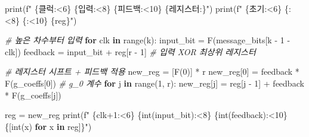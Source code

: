 \documentclass[
  oneside]{article}
\newenvironment{Shaded}{}{}
\newcommand{\BuiltInTok}[1]{\textcolor[rgb]{0.00,0.50,0.00}{#1}}
\newcommand{\CommentTok}[1]{\textcolor[rgb]{0.38,0.63,0.69}{\textit{#1}}}
\newcommand{\ControlFlowTok}[1]{\textcolor[rgb]{0.00,0.44,0.13}{\textbf{#1}}}
\newcommand{\DecValTok}[1]{\textcolor[rgb]{0.25,0.63,0.44}{#1}}
\newcommand{\KeywordTok}[1]{\textcolor[rgb]{0.00,0.44,0.13}{\textbf{#1}}}
\newcommand{\NormalTok}[1]{#1}
\newcommand{\OperatorTok}[1]{\textcolor[rgb]{0.40,0.40,0.40}{#1}}
\newcommand{\SpecialCharTok}[1]{\textcolor[rgb]{0.25,0.44,0.63}{#1}}
\newcommand{\SpecialStringTok}[1]{\textcolor[rgb]{0.73,0.40,0.53}{#1}}
\newcommand{\StringTok}[1]{\textcolor[rgb]{0.25,0.44,0.63}{#1}}
\begin{document}
\begin{Shaded}
\begin{Highlighting}[]
    \BuiltInTok{print}\NormalTok{(}\SpecialStringTok{f"  }\SpecialCharTok{\{}\StringTok{\textquotesingle{}클럭\textquotesingle{}}\SpecialCharTok{:\textless{}6\}}\SpecialStringTok{ }\SpecialCharTok{\{}\StringTok{\textquotesingle{}입력\textquotesingle{}}\SpecialCharTok{:\textless{}8\}}\SpecialStringTok{ }\SpecialCharTok{\{}\StringTok{\textquotesingle{}피드백\textquotesingle{}}\SpecialCharTok{:\textless{}10\}}\SpecialStringTok{ }\SpecialCharTok{\{}\StringTok{\textquotesingle{}레지스터\textquotesingle{}}\SpecialCharTok{:\}}\SpecialStringTok{"}\NormalTok{)}
    \BuiltInTok{print}\NormalTok{(}\SpecialStringTok{f"  }\SpecialCharTok{\{}\StringTok{\textquotesingle{}초기\textquotesingle{}}\SpecialCharTok{:\textless{}6\}}\SpecialStringTok{ }\SpecialCharTok{\{}\StringTok{\textquotesingle{}{-}\textquotesingle{}}\SpecialCharTok{:\textless{}8\}}\SpecialStringTok{ }\SpecialCharTok{\{}\StringTok{\textquotesingle{}{-}\textquotesingle{}}\SpecialCharTok{:\textless{}10\}}\SpecialStringTok{ }\SpecialCharTok{\{}\NormalTok{reg}\SpecialCharTok{\}}\SpecialStringTok{"}\NormalTok{)}

    \CommentTok{\# 높은 차수부터 입력}
    \ControlFlowTok{for}\NormalTok{ clk }\KeywordTok{in} \BuiltInTok{range}\NormalTok{(k):}
\NormalTok{        input\_bit }\OperatorTok{=}\NormalTok{ F(message\_bits[k }\OperatorTok{{-}} \DecValTok{1} \OperatorTok{{-}}\NormalTok{ clk])}
\NormalTok{        feedback }\OperatorTok{=}\NormalTok{ input\_bit }\OperatorTok{+}\NormalTok{ reg[r }\OperatorTok{{-}} \DecValTok{1}\NormalTok{]  }\CommentTok{\# 입력 XOR 최상위 레지스터}

        \CommentTok{\# 레지스터 시프트 + 피드백 적용}
\NormalTok{        new\_reg }\OperatorTok{=}\NormalTok{ [F(}\DecValTok{0}\NormalTok{)] }\OperatorTok{*}\NormalTok{ r}
\NormalTok{        new\_reg[}\DecValTok{0}\NormalTok{] }\OperatorTok{=}\NormalTok{ feedback }\OperatorTok{*}\NormalTok{ F(g\_coeffs[}\DecValTok{0}\NormalTok{])  }\CommentTok{\# g\_0 계수}
        \ControlFlowTok{for}\NormalTok{ j }\KeywordTok{in} \BuiltInTok{range}\NormalTok{(}\DecValTok{1}\NormalTok{, r):}
\NormalTok{            new\_reg[j] }\OperatorTok{=}\NormalTok{ reg[j }\OperatorTok{{-}} \DecValTok{1}\NormalTok{] }\OperatorTok{+}\NormalTok{ feedback }\OperatorTok{*}\NormalTok{ F(g\_coeffs[j])}

\NormalTok{        reg }\OperatorTok{=}\NormalTok{ new\_reg}
        \BuiltInTok{print}\NormalTok{(}\SpecialStringTok{f"  }\SpecialCharTok{\{}\NormalTok{clk}\OperatorTok{+}\DecValTok{1}\SpecialCharTok{:\textless{}6\}}\SpecialStringTok{ }\SpecialCharTok{\{}\BuiltInTok{int}\NormalTok{(input\_bit)}\SpecialCharTok{:\textless{}8\}}\SpecialStringTok{ }\SpecialCharTok{\{}\BuiltInTok{int}\NormalTok{(feedback)}\SpecialCharTok{:\textless{}10\}}\SpecialStringTok{ }\SpecialCharTok{\{}\NormalTok{[}\BuiltInTok{int}\NormalTok{(x) }\ControlFlowTok{for}\NormalTok{ x }\KeywordTok{in}\NormalTok{ reg]}\SpecialCharTok{\}}\SpecialStringTok{"}\NormalTok{)}


\end{Highlighting}
\end{Shaded}
\end{document}
